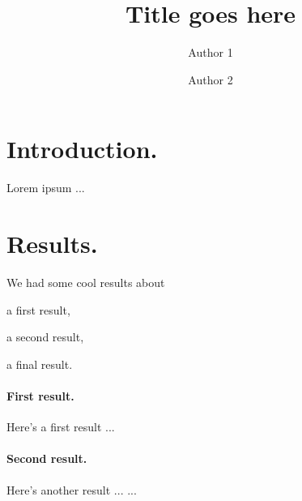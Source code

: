 \documentclass[papertype=a4paper]{phfextendedabstract}
\begin{document}
\title{Title goes here}
\author{Author 1}
\author{Author 2}
\maketitle
\section{Introduction.}
Lorem ipsum ...
\section{Results.}
We had some cool results about
\begin{enumerate*}
\item a first result,
\item a second result,
\item a final result.
\end{enumerate*}
\paragraph{First result.}
Here’s a first result ...
\paragraph{Second result.}
Here’s another result ...
...
\end{document}
